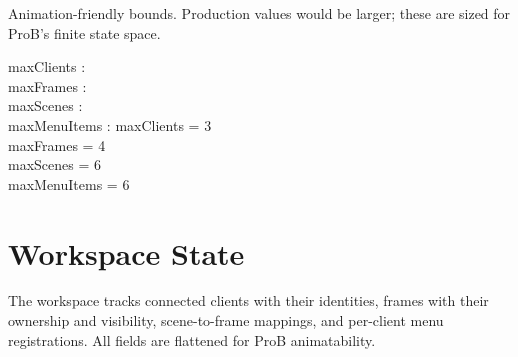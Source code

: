 \documentclass[a4paper,10pt,fleqn]{article}
\begin{document}
Animation-friendly bounds.  Production values would be larger;
these are sized for ProB's finite state space.

\begin{axdef}
  maxClients : \nat \\
  maxFrames : \nat \\
  maxScenes : \nat \\
  maxMenuItems : \nat
  \where
  maxClients = 3 \\
  maxFrames = 4 \\
  maxScenes = 6 \\
  maxMenuItems = 6
\end{axdef}

\section{Workspace State}

The workspace tracks connected clients with their identities,
frames with their ownership and visibility, scene-to-frame
mappings, and per-client menu registrations.  All fields are
flattened for ProB animatability.
\end{document}
